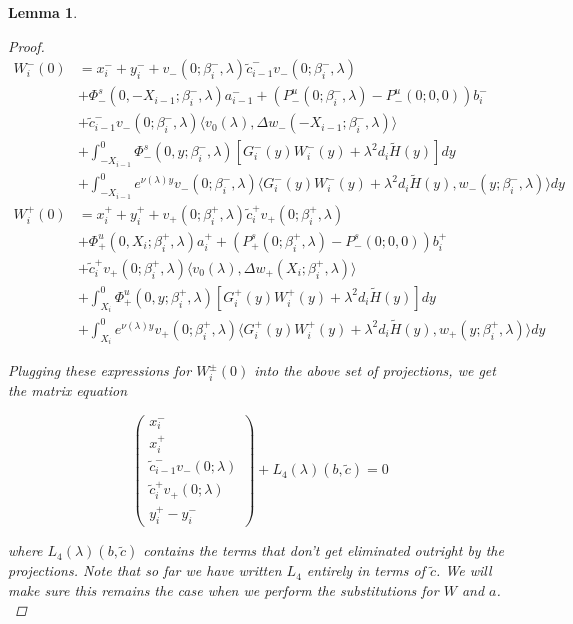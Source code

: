 \documentclass[12pt]{article}
\newtheorem{lemma}{Lemma}
\begin{document}
\begin{lemma}
\begin{proof}
\begin{align*}
W_i^-(0) &= x_i^- + y_i^- + v_-(0; \beta_i^-, \lambda) \tilde{c}_{i-1}^- v_-(0; \beta_i^-, \lambda) \\
&+\Phi^s_-(0, -X_{i-1}; \beta_i^-, \lambda)a_{i-1}^- + (P^u_-(0; \beta_i^-, \lambda) - P^u_-(0; 0, 0))b_i^- \\
&+ \tilde{c}_{i-1}^- v_-(0; \beta_i^-, \lambda) \langle v_0(\lambda), \Delta w_-(-X_{i-1}; \beta_i^-, \lambda) \rangle \\
&+ \int_{-X_{i-1}}^0 \Phi^s_-(0, y; \beta_i^-, \lambda) [ G_i^-(y)W_i^-(y) + \lambda^2 d_i \tilde{H}(y) ] dy \\
&+ \int_{-X_{i-1}}^0
e^{\nu(\lambda)y} v_-(0; \beta_i^-, \lambda) \langle G_i^-(y)W_i^-(y) + \lambda^2 d_i \tilde{H}(y), w_-(y; \beta_i^-, \lambda) \rangle dy \\
W_i^+(0) &= x_i^+ + y_i^+ + v_+(0; \beta_i^+, \lambda) \tilde{c}_i^+ v_+(0; \beta_i^+, \lambda) \\
&+\Phi^u_+(0, X_i; \beta_i^+, \lambda)a_i^+ + (P^s_+(0; \beta_i^+, \lambda) - P^s_-(0; 0, 0))b_i^+ \\
&+ \tilde{c}_i^+ v_+(0; \beta_i^+, \lambda) \langle v_0(\lambda), \Delta w_+(X_i; \beta_i^+, \lambda) \rangle \\  
&+ \int_{X_i}^0 \Phi^u_+(0, y; \beta_i^+, \lambda) [ G_i^+(y)W_i^+(y) + \lambda^2 d_i \tilde{H}(y) ] dy \\
&+ \int_{X_i}^0 e^{\nu(\lambda)y} v_+(0; \beta_i^+, \lambda) \langle G_i^+(y)W_i^+(y) + \lambda^2 d_i \tilde{H}(y), w_+(y; \beta_i^+, \lambda) \rangle dy
\end{align*}

Plugging these expressions for $W_i^\pm(0)$ into the above set of projections, we get the matrix equation

\[
\begin{pmatrix}x_i^- \\ x_i^+ \\ 
\tilde{c}_{i-1}^- v_-(0; \lambda) \\
\tilde{c}_i^+ v_+(0; \lambda) \\
y_i^+ - y_i^- \end{pmatrix} + L_4(\lambda)(b, \tilde{c}) = 0
\]

where $L_4(\lambda)(b, \tilde{c})$ contains the terms that don't get eliminated outright by the projections. Note that so far we have written $L_4$ entirely in terms of $\tilde{c}$. We will make sure this remains the case when we perform the substitutions for $W$ and $a$.\\


\end{proof}
\end{lemma}
\end{document}
